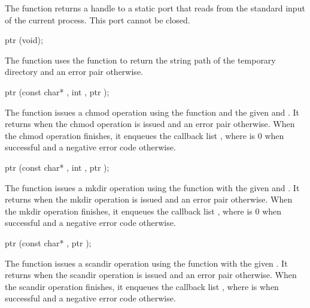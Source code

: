The  function returns a handle to a static port
that reads from the standard input of the current process. This port
cannot be closed.

\begin{function}
  ptr (void);
\end{function}

The  function uses the
 function to return the string path of the
temporary directory and an error pair otherwise.

\begin{function}
  ptr (const char* , int , ptr );
\end{function}

The  function issues a chmod operation using the
 function and the given  and
. It returns  when the chmod operation is issued
and an error pair otherwise. When the chmod operation finishes, it
enqueues the callback list , where
 is 0 when successful and a negative error code otherwise.

\begin{function}
  ptr (const char* , int , ptr );
\end{function}

The  function issues a mkdir operation
using the  function with the given  and
. It returns  when the mkdir operation is issued
and an error pair otherwise. When the mkdir operation finishes, it
enqueues the callback list , where
 is 0 when successful and a negative error code otherwise.

\begin{function}
  ptr (const char* , ptr );
\end{function}

The  function issues a scandir operation
using the  function with the given
. It returns  when the scandir operation is issued
and an error pair otherwise. When the scandir operation finishes, it
enqueues the callback list , where
 is  when successful and
a negative error code otherwise.

